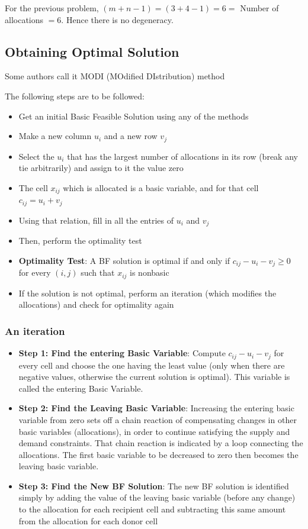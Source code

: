 \documentclass[12pt]{article}
\begin{document}
For the previous problem, $(m+n-1) = (3+4-1) =6=$  Number of allocations $= 6$. 
Hence there is no degeneracy.

\subsection*{Obtaining Optimal Solution}
{\scriptsize Some authors call it MODI (MOdified DIstribution) method}

The following steps are to be followed:
\begin{itemize}
\item Get an initial Basic Feasible Solution using any of the methods
\item Make a new column $u_i$ and a new row $v_j$
  \item Select the $u_i$ that has the largest number of allocations in its row (break any tie arbitrarily) and assign to it the value zero
  \item The cell $x_{ij}$ which is allocated is a basic variable, and for that cell $c_{ij} = u_i + v_j$
  \item Using that relation, fill in all the entries of $u_i$ and $v_j$
  \item Then, perform the optimality test
\item \textbf{Optimality Test}: A BF solution is optimal if and only if $c_{ij} - u_i - v_j \ge 0$ for every $(i, j)$ such that $x_{ij}$ is nonbasic
\item If the solution is not optimal, perform an iteration (which modifies the allocations) and check for optimality again
\end{itemize}

\subsubsection*{An iteration}
\begin{itemize}
\item \textbf{Step 1: Find the entering Basic Variable}: Compute $c_{ij} - u_i - v_j$ for every cell and choose the one having the least value (only when there are negative values, otherwise the current solution is optimal). This variable is called the entering Basic Variable.
\item \textbf{Step 2: Find the Leaving Basic Variable}: Increasing the entering basic variable from zero sets off a chain reaction of compensating changes in other basic variables (allocations), in order to continue satisfying the supply and demand constraints. That chain reaction is indicated by a loop connecting the allocations. The first basic variable to be decreased to zero then becomes the leaving basic variable.
\item \textbf{Step 3: Find the New BF Solution}: The new BF solution is identified simply by adding the value of the leaving basic variable (before any change) to the allocation for each recipient cell and subtracting this same amount from the allocation for each donor cell
\end{itemize}
\end{document}
